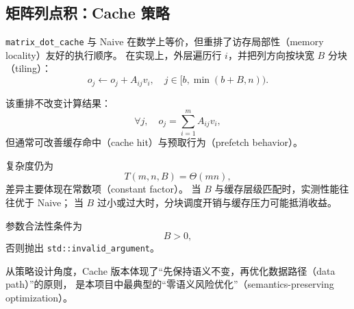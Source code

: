 \subsection{矩阵列点积：Cache 策略}

\texttt{matrix\_dot\_cache} 与 Naive 在数学上等价，但重排了访存局部性（memory locality）友好的执行顺序。
在实现上，外层遍历行 \(i\)，并把列方向按块宽 \(B\) 分块（tiling）：
\begin{equation}
 o_j \leftarrow o_j + A_{ij}v_i,\quad
j\in[b,\min(b+B,n)).
\end{equation}

该重排不改变计算结果：
\begin{equation}
\forall j,\quad o_j=\sum_{i=1}^{m}A_{ij}v_i,
\end{equation}
但通常可改善缓存命中（cache hit）与预取行为（prefetch behavior）。

复杂度仍为
\begin{equation}
T(m,n,B)=\Theta(mn),
\end{equation}
差异主要体现在常数项（constant factor）。
当 \(B\) 与缓存层级匹配时，实测性能往往优于 Naive；
当 \(B\) 过小或过大时，分块调度开销与缓存压力可能抵消收益。

参数合法性条件为
\begin{equation}
B>0,
\end{equation}
否则抛出 \texttt{std::invalid\_argument}。

从策略设计角度，Cache 版本体现了“先保持语义不变，再优化数据路径（data path）”的原则，
是本项目中最典型的“零语义风险优化”（semantics-preserving optimization）。
